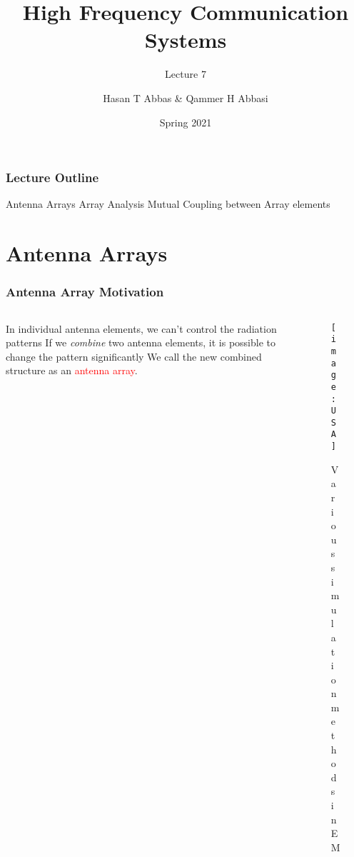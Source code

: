 \documentclass[10pt]{beamer}
\title{High Frequency Communication Systems}
\subtitle{Lecture 7}
\date{Spring 2021}
\author{Hasan T Abbas \& Qammer H Abbasi}
\begin{document}
\maketitle

\begin{frame}[fragile]
    \frametitle{Lecture Outline}
    \begin{outline}[itemize]
        \1 Antenna Arrays
        \1 Array Analysis
        \1 Mutual Coupling between Array elements
    \end{outline}
\end{frame}

\section{Antenna Arrays}




\begin{frame}
    \frametitle{Antenna Array Motivation}

    \begin{columns}[T]
        \begin{column}{.4\textwidth}
            \begin{outline}
                \1 In individual antenna elements, we can't control the radiation patterns
                \1 If we \textit{combine} two antenna elements, it is possible to change the pattern significantly
                \2 We call the new combined structure as an \textcolor{red}{antenna array}.
                \1 
            \end{outline}
        \end{column}
        \begin{column}{.6\textwidth}
            \begin{figure}[h!]
                \centering
                \texttt{[image: USA]}
                \caption{Various simulation methods in EM}
            \end{figure}
        \end{column}
    \end{columns}


\end{frame}
\end{document}
